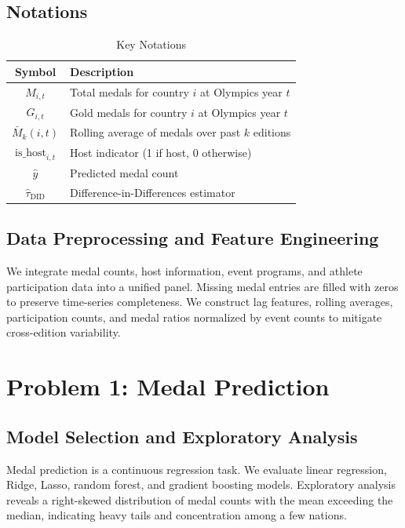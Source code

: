 \documentclass{mcmthesis}
\begin{document}
\subsection{Notations}
\begin{table}[htbp]
\centering
\caption{Key Notations}
\label{tab:notations}
\begin{tabular}{cl}
\toprule
\textbf{Symbol} & \textbf{Description} \\
\midrule
$M_{i,t}$ & Total medals for country $i$ at Olympics year $t$ \\
$G_{i,t}$ & Gold medals for country $i$ at Olympics year $t$ \\
$\bar{M}_{k}(i,t)$ & Rolling average of medals over past $k$ editions \\
$\text{is\_host}_{i,t}$ & Host indicator (1 if host, 0 otherwise) \\
$\hat{y}$ & Predicted medal count \\
$\hat{\tau}_{\text{DID}}$ & Difference-in-Differences estimator \\
\bottomrule
\end{tabular}
\end{table}

\subsection{Data Preprocessing and Feature Engineering}
We integrate medal counts, host information, event programs, and athlete participation data into a unified panel. Missing medal entries are filled with zeros to preserve time-series completeness. We construct lag features, rolling averages, participation counts, and medal ratios normalized by event counts to mitigate cross-edition variability.

\section{Problem 1: Medal Prediction}
\subsection{Model Selection and Exploratory Analysis}
Medal prediction is a continuous regression task. We evaluate linear regression, Ridge, Lasso, random forest, and gradient boosting models. Exploratory analysis reveals a right-skewed distribution of medal counts with the mean exceeding the median, indicating heavy tails and concentration among a few nations.
\end{document}
